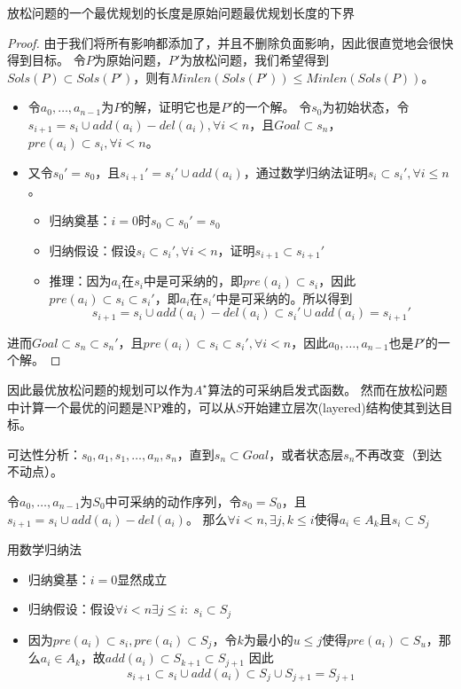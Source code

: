 \begin{theorem}
放松问题的一个最优规划的长度是原始问题最优规划长度的下界
\end{theorem}
\begin{proof}
由于我们将所有影响都添加了，并且不删除负面影响，因此很直觉地会很快得到目标。
令$P$为原始问题，$P'$为放松问题，我们希望得到$Sols(P)\subset Sols(P')$，则有$Minlen(Sols(P'))\leq Minlen(Sols(P))$。
\begin{itemize}
\item 令$a_0,\ldots,a_{n-1}$为$P$的解，证明它也是$P'$的一个解。
令$s_0$为初始状态，令$s_{i+1}=s_i\cup add(a_i)-del(a_i),\forall i<n$，且$Goal\subset s_n$，$pre(a_i)\subset s_i,\forall i < n$。
\item 又令$s_0'=s_0$，且$s_{i+1}'=s_i'\cup add(a_i)$，通过数学归纳法证明$s_i\subset s_i',\forall i \leq n$。
\begin{itemize}
	\item 归纳奠基：$i=0$时$s_0\subset s_0'=s_0$
	\item 归纳假设：假设$s_i\subset s_i',\forall i<n$，证明$s_{i+1}\subset s_{i+1}'$
	\item 推理：因为$a_i$在$s_i$中是可采纳的，即$pre(a_i)\subset s_i$，因此$pre(a_i)\subset s_i\subset s_i'$，即$a_i$在$s_i'$中是可采纳的。所以得到
	\[s_{i+1}=s_i\cup add(a_i)-del(a_i)\subset s_i'\cup add(a_i)=s_{i+1}'\]
\end{itemize}
\end{itemize}
进而$Goal\subset s_n\subset s_n'$，且$pre(a_i)\subset s_i\subset s_i',\forall i<n$，因此$a_0,\ldots,a_{n-1}$也是$P'$的一个解。
\end{proof}

因此最优放松问题的规划可以作为$A^\star$算法的可采纳启发式函数。
然而在放松问题中计算一个最优的问题是NP难的，可以从$S$开始建立层次(layered)结构使其到达目标。

可达性分析：$s_0,a_1,s_1,\ldots,a_n,s_n$，直到$s_n\subset Goal$，或者状态层$s_n$不再改变（到达不动点）。
\begin{proposition}
令$a_0,\ldots,a_{n-1}$为$S_0$中可采纳的动作序列，令$s_0=S_0$，且$s_{i+1}=s_i\cup add(a_i)-del(a_i)$。
那么$\forall i<n,\exists j,k\leq i$使得$a_i\in A_k$且$s_i\subset S_j$
\end{proposition}
\begin{analysis}
用数学归纳法
\begin{itemize}
	\item 归纳奠基：$i=0$显然成立
	\item 归纳假设：假设$\forall i <n \exists j\leq i:\;s_i\subset S_j$
	\item 因为$pre(a_i)\subset s_i,pre(a_i)\subset S_j$，令$k$为最小的$u\leq j$使得$pre(a_i)\subset S_u$，那么$a_i\in A_k$，故$add(a_i)\subset S_{k+1}\subset S_{j+1}$
	因此
	\[s_{i+1}\subset s_i\cup add(a_i)\subset S_j\cup S_{j+1}=S_{j+1}\]
\end{itemize}
\end{analysis}

